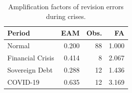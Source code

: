 \begin{table}
\caption{Amplification factors of revision errors during crises.}
\label{tab:amplification}
\begin{tabular}{lrrr}
\toprule
Period & EAM & Obs. & FA \\
\midrule
Normal & 0.200 & 88 & 1.000 \\
Financial Crisis & 0.414 & 8 & 2.067 \\
Sovereign Debt & 0.288 & 12 & 1.436 \\
COVID-19 & 0.635 & 12 & 3.169 \\
\bottomrule
\end{tabular}
\end{table}
